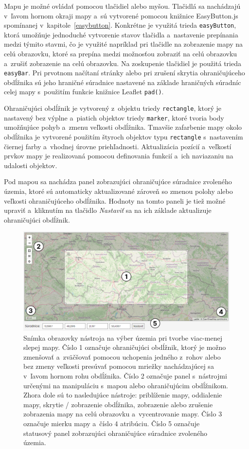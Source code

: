 Mapu je možné ovládať pomocou tlačidiel alebo myšou. Tlačidlá sa nachádzajú v~ľavom hornom okraji mapy a~sú vytvorené pomocou knižnice EasyButton.js spomínanej v~kapitole~\ref{easybutton}. Konkrétne je využitá trieda {\tt easyButton}, ktorá umožňuje jednoduché vytvorenie stavov tlačidla a~nastavenie prepínania medzi týmito stavmi, čo je využité napríklad pri tlačidle na zobrazenie mapy na celú obrazovku, ktoré sa prepína medzi možnosťou zobraziť na celú obrazovku a~zrušiť zobrazenie na celú obrazovku. Na zoskupenie tlačidiel je použitá trieda {\tt easyBar}. Pri prvotnom načítaní stránky alebo pri zrušení skrytia ohraničujúceho obdĺžnika sú jeho hraničné súradnice nastavené na základe hraničných súradníc celej mapy s~použitím funkcie knižnice Leaflet {\tt pad()}.

Ohraničujúci obdĺžnik je vytvorený z~objektu triedy {\tt rectangle}, ktorý je nastavený bez výplne a~piatich objektov triedy {\tt marker}, ktoré tvoria body umožňujúce pohyb a~zmenu veľkosti obdĺžnika. Tmavšie zafarbenie mapy okolo obdĺžnika je vytvorené použitím štyroch objektov typu {\tt rectangle} s~nastavením čiernej farby a~vhodnej úrovne priehľadnosti. Aktualizácia pozícií a~veľkostí prvkov mapy je realizovaná pomocou definovania funkcií a~ich naviazaniu na udalosti objektov.

Pod mapou sa nachádza panel zobrazujúci ohraničujúce súradnice zvoleného územia, ktoré sú automaticky aktualizované zároveň so zmenou polohy alebo veľkosti ohraničujúceho obdĺžnika. Hodnoty na tomto paneli je tiež možné upraviť a~kliknutím na tlačidlo {\it Nastaviť} sa na ich základe aktualizuje ohraničujúci obdĺžnik.

\begin{figure}[hbt]
	\centering
	\includegraphics[width=1\textwidth]{obrazky-figures/img_leaflet.png}
	\caption{Snímka obrazovky nástroja na výber územia pri tvorbe viac-menej slepej mapy. Číslo 1 označuje ohraničujúci obdĺžnik, ktorý je možno zmenšovať a~zväčšovať pomocou  uchopenia jedného z~rohov alebo bez zmeny veľkosti presúvať pomocou mriežky nachádzajúcej sa v~ľavom hornom rohu obdĺžnika. Číslo 2 označuje panel s~nástrojmi určenými na manipuláciu s~mapou alebo ohraničujúcim obdĺžnikom. Zhora dole sú to nasledujúce nástroje: priblíženie mapy, oddialenie mapy, skrytie / zobrazenie obdĺžnika, zobrazenie alebo zrušenie zobrazenia mapy na celú obrazovku a~vycentrovanie mapy. Číslo 3 označuje mierku mapy a~číslo 4 atribúciu. Číslo 5 označuje statusový panel zobrazujúci ohraničujúce súradnice zvoleného územia.}
	\label{img_leaflet}
\end{figure}



